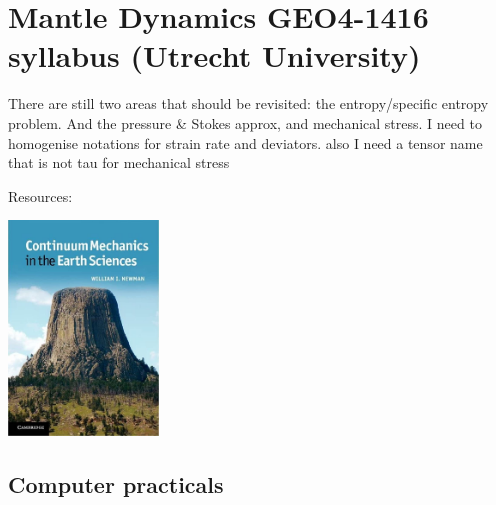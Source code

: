 \chapter{Mantle Dynamics GEO4-1416 syllabus (Utrecht University)} %

\begin{remark}
There are still two areas that should be revisited: the entropy/specific entropy problem. 
And the pressure \& Stokes approx, and mechanical stress.  
I need to homogenise notations for strain rate and deviators.
also I need a tensor name that is not tau for mechanical stress
\end{remark}

Resources:

\begin{center}
\includegraphics[width=4cm]{images/chapter_md/newman}\\
\end{center}




\newpage

\section{Computer practicals} 

